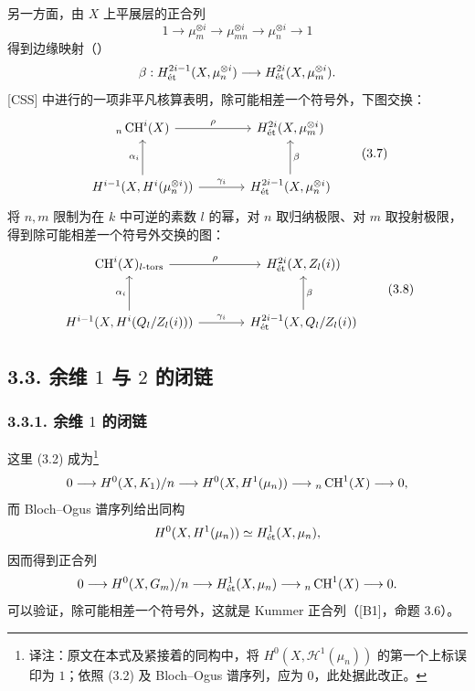 另一方面，由 $X$ 上平展层的正合列
\[
1\longrightarrow\mu_m^{\otimes i}\longrightarrow\mu_{mn}^{\otimes i}\longrightarrow\mu_n^{\otimes i}\longrightarrow1
\]
得到边缘映射（）
\[
\beta:H^{2i-1}_{\mathrm{\acute et}}(X,\mu_n^{\otimes i})\longrightarrow H^{2i}_{\mathrm{\acute et}}(X,\mu_m^{\otimes i}).
\]
[CSS] 中进行的一项非平凡核算表明，除可能相差一个符号外，下图交换：
\begin{equation*}
\begin{tikzcd}[ampersand replacement=\&,column sep=large,row sep=large]
{}_n\CH^i(X) \arrow[r,"{\rho}"] \& H^{2i}_{\et}(X,\mu_m^{\otimes i})\\
H^{i-1}(X,\mathcal H^i(\mu_n^{\otimes i})) \arrow[u,"{\alpha_i}"] \arrow[r,"{\gamma_i}"] \& H^{2i-1}_{\et}(X,\mu_n^{\otimes i}) \arrow[u,"{\beta}"']
\end{tikzcd}\tag{3.7}
\end{equation*}
将 $n,m$ 限制为在 $k$ 中可逆的素数 $l$ 的幂，对 $n$ 取归纳极限、对 $m$ 取投射极限，得到除可能相差一个符号外交换的图：
\begin{equation*}
\begin{tikzcd}[ampersand replacement=\&,column sep=large,row sep=large]
\CH^i(X)_{l\text{-}\mathrm{tors}} \arrow[r,"{\rho}"] \& H^{2i}_{\et}(X,\mathbb Z_l(i))\\
H^{i-1}(X,\mathcal H^i(\mathbb Q_l/\mathbb Z_l(i))) \arrow[u,"{\alpha_i}"] \arrow[r,"{\gamma_i}"] \& H^{2i-1}_{\et}(X,\mathbb Q_l/\mathbb Z_l(i)) \arrow[u,"{\beta}"']
\end{tikzcd}\tag{3.8}
\end{equation*}

\subsection*{3.3. 余维 $1$ 与 $2$ 的闭链}
\subsubsection*{3.3.1. 余维 $1$ 的闭链}
这里 (3.2) 成为\footnote{译注：原文在本式及紧接着的同构中，将 $H^0(X,\mathcal H^1(\mu_n))$ 的第一个上标误印为 $1$；依照 (3.2) 及 Bloch--Ogus 谱序列，应为 $0$，此处据此改正。}
\[
0\longrightarrow H^0(X,K_1)/n\longrightarrow H^0(X,H^1(\mu_n))\longrightarrow{}_n\operatorname{CH}^1(X)\longrightarrow0,
\]
而 Bloch--Ogus 谱序列给出同构
\[
H^0(X,H^1(\mu_n))\simeq H^1_{\mathrm{\acute et}}(X,\mu_n),
\]
因而得到正合列
\[
0\longrightarrow H^0(X,G_m)/n\longrightarrow H^1_{\mathrm{\acute et}}(X,\mu_n)\longrightarrow{}_n\operatorname{CH}^1(X)\longrightarrow0.
\]
可以验证，除可能相差一个符号外，这就是 Kummer 正合列（[B1]，命题 3.6）。

